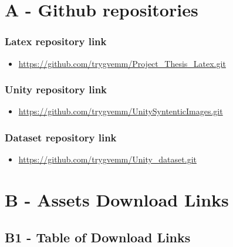 \chapter*{A - Github repositories}


\subsection*{Latex repository link}
\begin{itemize}
    \item \url{https://github.com/trygvemm/Project_Thesis_Latex.git}
\end{itemize}
\subsection*{Unity repository link}
\begin{itemize}
    \item \url{https://github.com/trygvemm/UnitySyntenticImages.git}
\end{itemize}
\subsection*{Dataset repository link}
\begin{itemize}
    \item \url{https://github.com/trygvemm/Unity_dataset.git}
\end{itemize}





\chapter*{B - Assets Download Links}

\renewcommand{\thefigure}{B.\arabic{figure}}
\setcounter{figure}{0}
\renewcommand{\thetable}{B.\arabic{table}}
\setcounter{table}{0}


\section*{\large{B1 - Table of Download Links}}
\vspace*{1cm}

